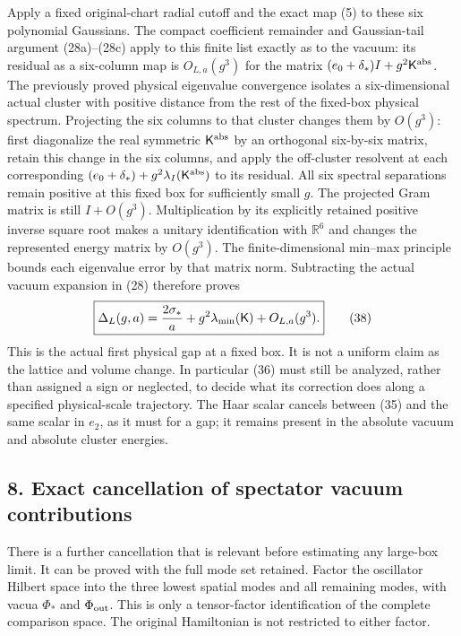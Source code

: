 \documentclass[
  11pt,
]{article}
\begin{document}
Apply a fixed original-chart radial cutoff and the exact map (5) to
these six polynomial Gaussians. The compact coefficient remainder and
Gaussian-tail argument (28a)--(28c) apply to this finite list exactly as
to the vacuum: its residual as a six-column map is \(O_{L,a}(g^3)\) for
the matrix \((e_0+\delta_*)I+g^2\mathsf K^{\rm abs}\). The previously
proved physical eigenvalue convergence isolates a six-dimensional actual
cluster with positive distance from the rest of the fixed-box physical
spectrum. Projecting the six columns to that cluster changes them by
\(O(g^3)\): first diagonalize the real symmetric \(\mathsf K^{\rm abs}\)
by an orthogonal six-by-six matrix, retain this change in the six
columns, and apply the off-cluster resolvent at each corresponding
\((e_0+\delta_*)+g^2\lambda_I(\mathsf K^{\rm abs})\) to its residual.
All six spectral separations remain positive at this fixed box for
sufficiently small \(g\). The projected Gram matrix is still
\(I+O(g^3)\). Multiplication by its explicitly retained positive inverse
square root makes a unitary identification with \(\mathbb R^6\) and
changes the represented energy matrix by \(O(g^3)\). The
finite-dimensional min--max principle bounds each eigenvalue error by
that matrix norm. Subtracting the actual vacuum expansion in (28)
therefore proves \[
 \boxed{\Delta_L(g,a)=
       {2\sigma_*\over a}+g^2\lambda_{\min}(\mathsf K)
                                     +O_{L,a}(g^3).}
 \tag{38}
\] This is the actual first physical gap at a fixed box. It is not a
uniform claim as the lattice and volume change. In particular (36) must
still be analyzed, rather than assigned a sign or neglected, to decide
what its correction does along a specified physical-scale trajectory.
The Haar scalar cancels between (35) and the same scalar in \(e_2\), as
it must for a gap; it remains present in the absolute vacuum and
absolute cluster energies.

\subsection{8. Exact cancellation of spectator vacuum
contributions}\label{weak-coupling-part-15-exact-cancellation-of-spectator-vacuum-contributions}

There is a further cancellation that is relevant before estimating any
large-box limit. It can be proved with the full mode set retained.
Factor the oscillator Hilbert space into the three lowest spatial modes
and all remaining modes, with vacua \(\Phi_*\) and \(\Phi_{\rm out}\).
This is only a tensor-factor identification of the complete comparison
space. The original Hamiltonian is not restricted to either factor.
\end{document}
